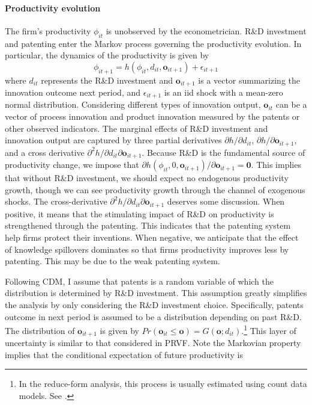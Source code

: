 \documentclass[11pt]{article}
\begin{document}
\paragraph{Productivity evolution}The firm's productivity $\phi_{it}$ is unobserved by the econometrician. R\&D investment and patenting enter the Markov process governing the productivity evolution. In particular, the dynamics of the productivity is given by
\begin{equation}
    \phi_{it+1} = h(\phi_{it},d_{it},\mathbf{o}_{it+1})+\epsilon_{it+1}
\end{equation}
where $d_{it}$ represents the R\&D investment and $\mathbf{o}_{it+1}$ is a vector summarizing the innovation outcome next period, and $\epsilon_{it+1}$ is an iid shock with a mean-zero normal distribution. Considering different types of innovation output, $\mathbf{o}_{it}$ can be a vector of process innovation and product innovation measured by the patents or other observed indicators. The marginal effects of R\&D investment and innovation output are captured by three partial derivatives $\partial h/\partial d_{it}$, $\partial h/\partial \mathbf{o}_{it+1}$, and a cross derivative $\partial ^2h/\partial d_{it} \partial \mathbf{o}_{it+1}$. Because R\&D is the fundamental source of productivity change, we impose that $ \partial h(\phi_{it}, 0, \mathbf{o}_{it+1})/\partial\mathbf{o}_{it+1} = \mathbf{0}$. This implies that without R\&D investment, we should expect no endogenous productivity growth, though we can see productivity growth through the channel of exogenous shocks. The cross-derivative $\partial ^2h/\partial d_{it} \partial \mathbf{o}_{it+1}$ deserves some discussion. When positive, it means that the stimulating impact of R\&D on productivity is strengthened through the patenting. This indicates that the patenting system help firms protect their inventions. When negative, we anticipate that the effect of knowledge spillovers dominates so that firms productivity improves less by patenting. This may be due to the weak patenting system.

Following CDM, I assume that patents is a random variable of which the distribution is determined by R\&D investment. This assumption greatly simplifies the analysis by only considering the R\&D investment choice. Specifically, patents outcome in next period is assumed to be a distribution depending on past R\&D. The distribution of $\mathbf{o}_{it+1}$ is given by $Pr(\mathbf{o}_{it}\leq \mathbf{o}) = G(\mathbf{o};d_{it})$.\footnote{In the reduce-form analysis, this process is usually estimated using count data models. See \cite{hall1989research,hall2010handbook}.} This layer of uncertainty is similar to that considered in PRVF. Note the Markovian property implies that the conditional expectation of future productivity is 
\end{document}
